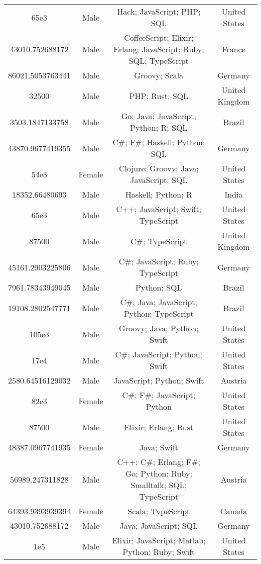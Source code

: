\begin{center}
\begin{tabular}{ |c|c|c|c| }
65e3  &  Male  &  Hack; JavaScript; PHP; SQL  &  United States  \\ 
43010.752688172  &  Male  &  CoffeeScript; Elixir; Erlang; JavaScript; Ruby; SQL; TypeScript  &  France  \\ 
86021.5053763441  &  Male  &  Groovy; Scala  &  Germany  \\ 
32500  &  Male  &  PHP; Rust; SQL  &  United Kingdom  \\ 
3503.1847133758  &  Male  &  Go; Java; JavaScript; Python; R; SQL  &  Brazil  \\ 
43870.9677419355  &  Male  &  C\#; F\#; Haskell; Python; SQL  &  Germany  \\ 
54e3  &  Female  &  Clojure; Groovy; Java; JavaScript; SQL  &  United States  \\ 
18352.66480693  &  Male  &  Haskell; Python; R  &  India  \\ 
65e3  &  Male  &  C++; JavaScript; Swift; TypeScript  &  United States  \\ 
87500  &  Male  &  C\#; TypeScript  &  United Kingdom  \\ 
45161.2903225806  &  Male  &  C\#; JavaScript; Ruby; TypeScript  &  Germany  \\ 
7961.78343949045  &  Male  &  Python; SQL  &  Brazil  \\ 
19108.2802547771  &  Male  &  C\#; Java; JavaScript; Python; TypeScript  &  Brazil  \\ 
105e3  &  Male  &  Groovy; Java; Python; Swift  &  United States  \\ 
17e4  &  Male  &  C\#; JavaScript; Python; Swift  &  United States  \\ 
2580.64516129032  &  Male  &  JavaScript; Python; Swift  &  Austria  \\ 
82e3  &  Female  &  C\#; F\#; JavaScript; Python  &  United States  \\ 
87500  &  Male  &  Elixir; Erlang; Rust  &  United States  \\ 
48387.0967741935  &  Female  &  Java; Swift  &  Germany  \\ 
56989.247311828  &  Male  &  C++; C\#; Erlang; F\#; Go; Python; Ruby; Smalltalk; SQL; TypeScript  &  Austria  \\ 
64393.9393939394  &  Female  &  Scala; TypeScript  &  Canada  \\ 
43010.752688172  &  Male  &  Java; JavaScript; SQL  &  Germany  \\ 
1e5  &  Male  &  Elixir; JavaScript; Matlab; Python; Ruby; Swift  &  United States  \\ 

\end{tabular}
\end{center}
